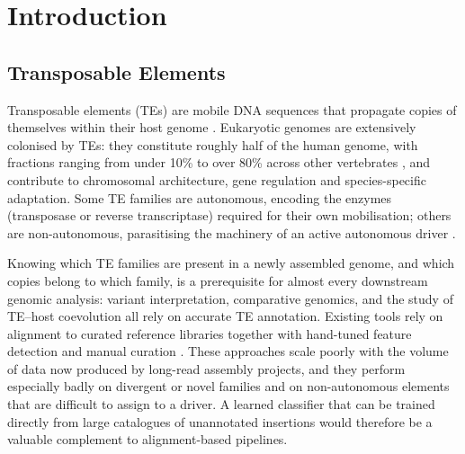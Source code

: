 \documentclass[12pt]{article}
\begin{document}
%
\fi

\newpage
\section{Introduction}

\subsection{Transposable Elements}

Transposable elements (TEs) are mobile DNA sequences that propagate copies of themselves within their host genome \cite{mcclintock1950,wells2020field}. Eukaryotic genomes are extensively colonised by TEs: they constitute roughly half of the human genome, with fractions ranging from under 10\% to over 80\% across other vertebrates \cite{wells2020field}, and contribute to chromosomal architecture, gene regulation and species-specific adaptation. Some TE families are autonomous, encoding the enzymes (transposase or reverse transcriptase) required for their own mobilisation; others are non-autonomous, parasitising the machinery of an active autonomous driver \cite{wicker2007unified,wells2020field}.

Knowing which TE families are present in a newly assembled genome, and which copies belong to which family, is a prerequisite for almost every downstream genomic analysis: variant interpretation, comparative genomics, and the study of TE--host coevolution all rely on accurate TE annotation. Existing tools rely on alignment to curated reference libraries together with hand-tuned feature detection and manual curation \cite{smit2015repeatmasker,flynn2020repeatmodeler2}. These approaches scale poorly with the volume of data now produced by long-read assembly projects, and they perform especially badly on divergent or novel families and on non-autonomous elements that are difficult to assign to a driver. A learned classifier that can be trained directly from large catalogues of unannotated insertions would therefore be a valuable complement to alignment-based pipelines.
\end{document}
